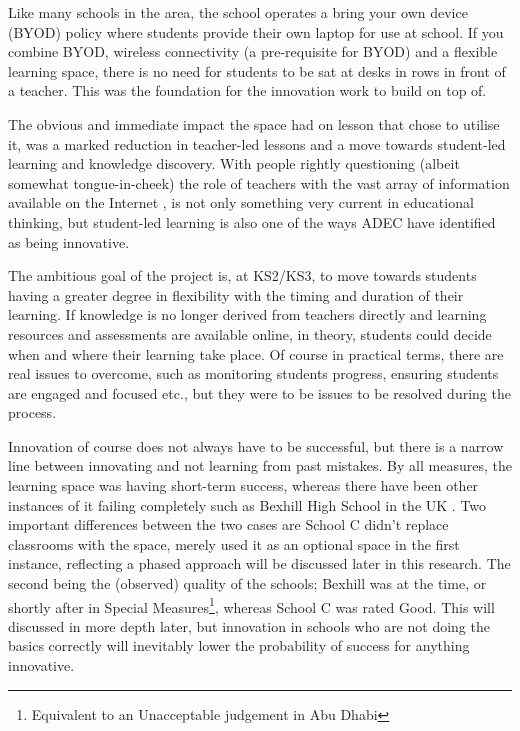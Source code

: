 Like many schools in the area, the school operates a bring your own device (BYOD) policy where students provide their own laptop for use at school. If you combine BYOD, wireless connectivity (a pre-requisite for BYOD) and a flexible learning space, there is no need for students to be sat at desks in rows in front of a teacher. This was the foundation for the innovation work to build on top of.

The obvious and immediate impact the space had on lesson that chose to utilise it, was a marked reduction in teacher-led lessons and a move towards student-led learning and knowledge discovery. With people rightly questioning (albeit somewhat tongue-in-cheek) the role of teachers with the vast array of information available on the Internet \cite{gilbert2010need}, is not only something very current in educational thinking, but student-led learning is also one of the ways ADEC have identified as being innovative.

The ambitious goal of the project is, at KS2/KS3, to move towards students having a greater degree in flexibility with the timing and duration of their learning. If knowledge is no longer derived from teachers directly and learning resources and assessments are available online, in theory, students could decide when and where their learning take place. Of course in practical terms, there are real issues to overcome, such as monitoring students progress, ensuring students are engaged and focused etc., but they were to be issues to be resolved during the process.

Innovation of course does not always have to be successful, but there is a narrow line between innovating and not learning from past mistakes. By all measures, the learning space was having short-term success, whereas there have been other instances of it failing completely such as Bexhill High School in the UK \cite{Lusher2015}. Two important differences between the two cases are School C didn't replace classrooms with the space, merely used it as an optional space in the first instance, reflecting a phased approach will be discussed later in this research. The second being the (observed) quality of the schools; Bexhill was at the time, or shortly after in Special Measures\footnote{Equivalent to an Unacceptable judgement in Abu Dhabi}, whereas School C was rated Good. This will discussed in more depth later, but innovation in schools who are not doing the basics correctly will inevitably lower the probability of success for anything innovative.

